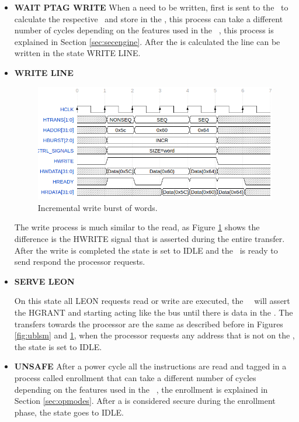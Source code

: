 \begin{itemize}
 \item{\textbf{WAIT PTAG WRITE}}
 When a \sline need to be written, first is sent to the \seceng~to calculate the respective \ptag~and store in the \ptagmem, this process can take a different number of cycles depending on the features used in the \seceng~, this process is explained in Section \ref{sec:secengine}. After the \ptag is calculated the line can be written in the state WRITE LINE.
 
 
 \item{\textbf{WRITE LINE}}
   \begin{figure}[H]
    \centering
    \includegraphics[width=\textwidth]{figures/others/ahbwrite.png}
    \caption{Incremental write burst of words.}
    \label{fig:ahbwrite}
  \end{figure}
The write process is much similar to the read, as Figure \ref{fig:ahbwrite} shows the difference is the HWRITE signal that is asserted during the entire transfer. After the write is completed the state is set to IDLE and the \handler~is ready to send respond the processor requests.

 \item{\textbf{SERVE LEON}}

 On this state all LEON requests read or write are executed, the \handler~~will assert the HGRANT and starting acting like the bus until there is data in the \sbuf. The transfers towards the processor are the same as described before in Figures \ref{fig:ublsm} and \ref{fig:ahbwrite}, when the processor requests any address that is not on the \sbuf, the state is set to IDLE.
 
\item{\textbf{UNSAFE}}
After a power cycle all the instructions are read and tagged in a process called enrollment that can take a different number of cycles depending on the features used in the \seceng~, the enrollment is explained in Section \ref{sec:opmodes}. After a \sline is considered secure during the enrollment phase, the state goes to IDLE.
 
\end{itemize}

